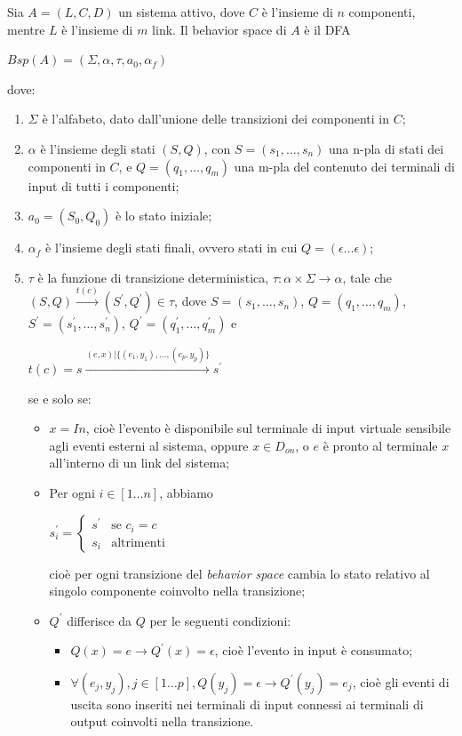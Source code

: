 \begin{defn}
Sia $A = (L,C,D)$ un sistema attivo, dove $C$ è l'insieme di $n$ componenti, mentre $L$ è l'insieme di $m$ link. Il behavior space di $A$ è il DFA
\begin{center}
	$Bsp(A) = (\Sigma,\alpha,\tau,a_0,\alpha_f)$
\end{center}
dove:
\begin{enumerate}
\item $\Sigma$ è l'alfabeto, dato dall'unione delle transizioni dei componenti in $C$;
\item $\alpha$  è l'insieme degli stati $(S,Q)$, con $S = (s_1,\ldots,s_n)$ una n-pla di stati dei componenti in $C$, e $Q = (q_1, \ldots,q_m)$ una m-pla del contenuto dei terminali di input di tutti i componenti;
\item $a_0 = (S_0,Q_0)$ è lo stato iniziale;
\item $\alpha_f$ è l'insieme degli stati finali, ovvero stati in cui $Q = (\epsilon \ldots \epsilon)$;
\item $\tau$ è la funzione di transizione deterministica, $\tau: \alpha \times \Sigma \rightarrow \alpha$, tale che $(S,Q) \xrightarrow{t(c)} (S^\prime, Q^\prime) \in \tau$, dove $S = (s_1, \ldots,s_n)$, $Q = (q_1, \ldots,q_m)$, $S^\prime = (s^\prime_1, \ldots,s^\prime_n)$, $Q^\prime = (q^\prime_1, \ldots,q^\prime_m)$ e
\begin{center}
$t(c) = s \xrightarrow{(e,x) | \{(e_1,y_1), \ldots, (e_p,y_p)\}} s^\prime$
\end{center}
se e solo se:
\begin{itemize}
\item $x = In$, cioè l'evento è disponibile sul terminale di input virtuale sensibile agli eventi esterni al sistema, oppure $x \in D_{on}$, o $e$ è pronto al terminale $x$ all'interno di un link del sistema;
\item Per ogni $i \in [1 \ldots n]$, abbiamo
\begin{center}
$s^\prime_i = \begin{cases} s^\prime & \mbox{se }c_i = c\\ s_i & \mbox{altrimenti} \end{cases}$
\end{center}
cioè per ogni transizione del \emph{behavior space} cambia lo stato relativo al singolo componente coinvolto nella transizione;
\item $Q^\prime$ differisce da $Q$ per le seguenti condizioni:
\begin{itemize}
\item $Q(x) = e \rightarrow Q^\prime(x) = \epsilon$, cioè l'evento in input è consumato;
\item $\forall(e_j,y_j), j \in [1 \ldots p], Q(y_j) = \epsilon \rightarrow Q^\prime(y_j) = e_j$, cioè gli eventi di uscita sono inseriti nei terminali di input connessi ai terminali di output coinvolti nella transizione. 
\end{itemize}
\end{itemize}
\end{enumerate}
\end{defn}
